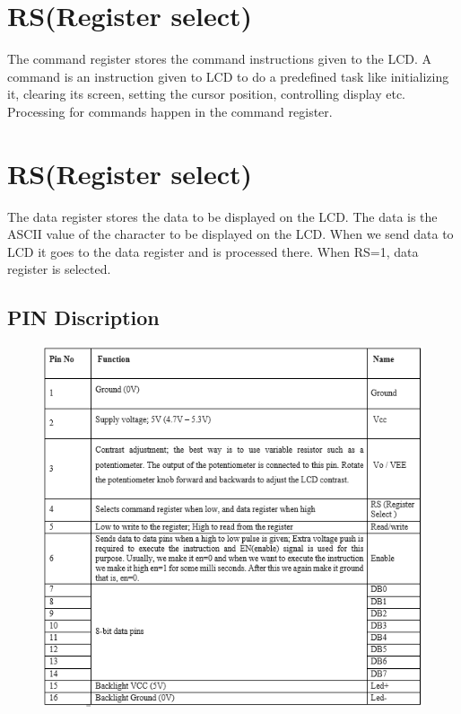 \documentclass[twoside,a4paper,16pt]{book}
\begin{document}
{{\section*{RS(Register select)}
The command register stores the command instructions given to the LCD. A command is an instruction given to LCD to do a predefined task like initializing it, clearing its screen, setting the cursor position, controlling display etc. Processing for commands happen in the command register.
\section*{RS(Register select)}
The data register stores the data to be displayed on the LCD. The data is the ASCII value of the character to be displayed on the LCD. When we send data to LCD it goes to the data register and is processed there. When RS=1, data register is selected.



\subsection{PIN Discription}
\begin{figure}[ht!]
	\begin{center}
		\includegraphics[width=13.0cm]{18.png}
	\end{center}
\end{figure}

}}
\end{document}

